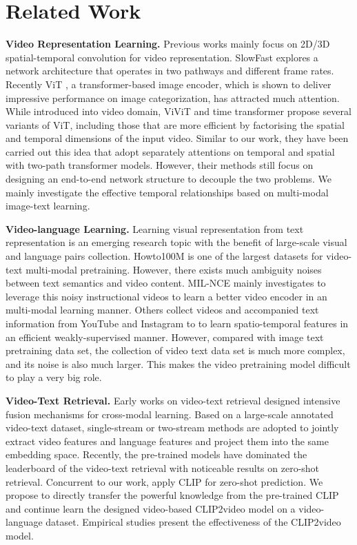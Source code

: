 \documentclass[final]{cvpr}
\begin{document}
\section{Related Work}

\textbf{Video Representation Learning.} 
Previous works mainly focus on 2D/3D spatial-temporal convolution for video representation. SlowFast \cite{feichtenhofer2019slowfast} explores a network architecture that operates in two pathways and different frame rates. 
Recently ViT \cite{dosovitskiy2020image}, a transformer-based image encoder, which is shown to deliver impressive performance on image categorization, has attracted much attention. While introduced into video domain, ViViT \cite{arnab2021vivit,sharir2021image} and time transformer \cite{TimeSformer} propose several variants of ViT, including those that are more efficient by factorising the spatial and temporal dimensions of the input video. Similar to our work, they have been carried out this idea that adopt separately attentions on temporal and spatial with two-path transformer models. However, their methods still focus on designing an end-to-end network structure to decouple the two problems. We mainly investigate the effective temporal relationships based on multi-modal image-text learning.

\textbf{Video-language Learning.} Learning visual representation from text representation is an emerging research topic with the benefit of large-scale visual and language pairs collection. Howto100M \cite{miech2019howto100m} is one of the largest datasets for video-text multi-modal pretraining. However, there exists much ambiguity noises between text semantics and video content. MIL-NCE \cite{miech2020end} mainly investigates to leverage this noisy instructional videos to learn a better video encoder in an multi-modal learning manner. 
Others \cite{lei2021less, Deepti2019large, Jonathan2020Web, Tianhao2020cpd} collect videos and accompanied text information from  YouTube and Instagram to to learn spatio-temporal features in an efficient weakly-supervised manner. However, compared with image text pretraining data set, the collection of video text data set is much more complex, and its noise is also much larger. This makes the video pretraining model difficult to play a very big role. 

\textbf{Video-Text Retrieval.} 
Early works on video-text retrieval designed intensive fusion mechanisms
for cross-modal learning. Based on a large-scale annotated video-text dataset, single-stream or two-stream methods \cite{zhu2020actbert, lei2021less, bain2021frozen, dzabraev2021mdmmt, zhang2018cross, dong2019dual} are adopted to jointly extract video features and language features and project them into the same embedding space. Recently, the pre-trained models have dominated the leaderboard of the video-text retrieval with noticeable results on zero-shot retrieval. Concurrent to our work, \cite{portillo2021straightforward} apply CLIP for
zero-shot prediction. We propose to directly transfer the powerful knowledge from the pre-trained CLIP and continue learn the designed video-based CLIP2video model on a video-language dataset. Empirical studies present the effectiveness of the CLIP2video model.
\end{document}
